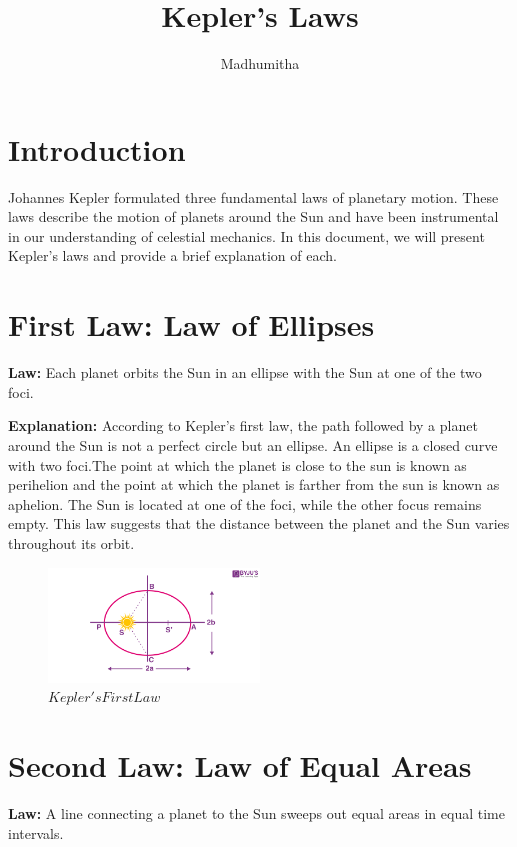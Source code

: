 \documentclass{article}
\title{Kepler's Laws}
\author{Madhumitha}
\begin{document}
\maketitle

\section{Introduction}
Johannes Kepler formulated three fundamental laws of planetary motion. These laws describe the motion of planets around the Sun and have been instrumental in our understanding of celestial mechanics. In this document, we will present Kepler's laws and provide a brief explanation of each.

\section{First Law: Law of Ellipses}
\textbf{Law:} Each planet orbits the Sun in an ellipse with the Sun at one of the two foci.

\textbf{Explanation:} According to Kepler's first law, the path followed by a planet around the Sun is not a perfect circle but an ellipse. An ellipse is a closed curve with two foci.The point at which the planet is close to the sun is known as perihelion and the point at which the planet is farther from the sun is known as aphelion. The Sun is located at one of the foci, while the other focus remains empty. This law suggests that the distance between the planet and the Sun varies throughout its orbit.

\begin{figure}[ht]
    \centering
    \includegraphics[width=0.5\textwidth]{imag1.jpg}
    \caption{$Kepler's First Law$}
    \label{fig:example}
\end{figure}

\section{Second Law: Law of Equal Areas}
\textbf{Law:} A line connecting a planet to the Sun sweeps out equal areas in equal time intervals.
\end{document}
